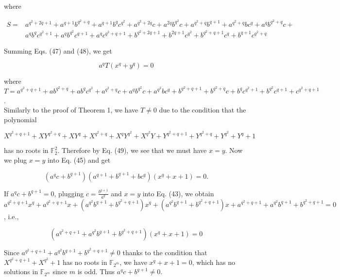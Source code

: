 \documentclass[10pt]{article}
\begin{document}
where

$$
\begin{aligned}
S= & a^{q^{2}+2 q+1}+a^{q+1} b^{q^{2}+q}+a^{q+1} b^{q} c^{q^{2}}+a^{q^{2}+2 q} c+a^{2 q} b^{q^{2}} c+a^{q^{2}+q} b^{q+1}+a^{q^{2}+q} b c^{q}+a^{q} b^{q^{2}+q} c+ \\
& a^{q} b^{q} c^{q^{2}+1}+a^{q} b^{q^{2}} c^{q+1}+a^{q} c^{q^{2}+q+1}+b^{q^{2}+2 q+1}+b^{2 q+1} c^{q^{2}}+b^{q^{2}+q+1} c^{q}+b^{q+1} c^{q^{2}+q}
\end{aligned}
$$

Summing Eqs. (47) and (48), we get


\begin{equation*}
a^{q} T\left(x^{q}+y^{q}\right)=0 \tag{49}
\end{equation*}


where\\
$T=a^{q^{2}+q+1}+a b^{q^{2}+q}+a b^{q} c^{q^{2}}+a^{q^{2}+q} c+a^{q} b^{q^{2}} c+a^{q^{2}} b c^{q}+b^{q^{2}+q+1}+b^{q^{2}+q} c+b^{q} c^{q^{2}+1}+b^{q^{2}} c^{q+1}+c^{q^{2}+q+1}$.\\
Similarly to the proof of Theorem 1, we have $T \neq 0$ due to the condition that the polynomial

$$
X^{q^{2}+q+1}+X Y^{q^{2}+q}+X Y^{q}+X^{q^{2}+q}+X^{q} Y^{q^{2}}+X^{q^{2}} Y+Y^{q^{2}+q+1}+Y^{q^{2}+q}+Y^{q^{2}}+Y^{q}+1
$$

has no roots in $\mathbb{F}_{2}^{2}$. Therefore by Eq. (49), we see that we must have $x=y$. Now we plug $x=y$ into Eq. (45) and get


\begin{equation*}
\left(a^{q} c+b^{q+1}\right)\left(a^{q+1}+b^{q+1}+b c^{q}\right)\left(x^{q}+x+1\right)=0 . \tag{50}
\end{equation*}


If $a^{q} c+b^{q+1}=0$, plugging $c=\frac{b^{q+1}}{a^{q}}$ and $x=y$ into Eq. (43), we obtain\\
$a^{q^{2}+q+1} x^{q}+a^{q^{2}+q+1} x+\left(a^{q^{2}} b^{q+1}+b^{q^{2}+q+1}\right) x^{q}+\left(a^{q^{2}} b^{q+1}+b^{q^{2}+q+1}\right) x+a^{q^{2}+q+1}+a^{q^{2}} b^{q+1}+b^{q^{2}+q+1}=0$, i.e.,

$$
\left(a^{q^{2}+q+1}+a^{q^{2}} b^{q+1}+b^{q^{2}+q+1}\right)\left(x^{q}+x+1\right)=0
$$

Since $a^{q^{2}+q+1}+a^{q^{2}} b^{q+1}+b^{q^{2}+q+1} \neq 0$ thanks to the condition that $X^{q^{2}+q+1}+X^{q^{2}}+1$ has no roots in $\mathbb{F}_{2^{m}}$, we have $x^{q}+x+1=0$, which has no solutions in $\mathbb{F}_{2^{m}}$ since $m$ is odd. Thus $a^{q} c+b^{q+1} \neq 0$.
\end{document}
